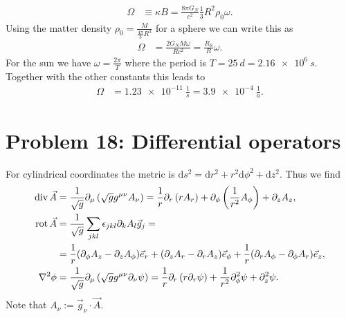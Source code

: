 \documentclass[english, parskip=full]{scrartcl}
\newcommand{\kla}{}
\newcommand{\tecxt}{}
\begin{document}
\begin{align}
\Omega &\equiv \kappa B = \frac{8\pi G_N}{c^2} \frac{1}{3} R^2\rho_0 \omega.
\end{align}
Using the matter density $\rho_0 = \frac{M}{\frac{4\pi}{3}R^3}$ for a sphere we can write this as
\begin{align}
\Omega &= \frac{2G_NM\omega}{Rc^2} = \frac{R_S}{R} \omega.
\end{align}
For the sun we have $\omega = \frac{2\pi}{T}$ where the period is $T = \SI{25}{d} = \SI{2.16e6}{s}$.
Together with the other constants this leads to 
\begin{align}
\Omega &= \SI{1.23e-11}{\frac{1}{s}} = \SI{3.9e-4}{\frac{1}{a}}.
\end{align}

\section{Problem 18: Differential operators}
For cylindrical coordinates the metric is $\tecxt\text{d}s^2 = \tecxt\text{d}r^2 + r^2\tecxt\text{d}\phi^2 + \tecxt\text{d}z^2$.
Thus we find
\begin{align}
\tecxt\text{div\,} \vec{A} &= \frac{1}{\sqrt{g}} \partial_\mu \kla\left( \sqrt{g} g^{\mu\nu} A_\nu \right) = \frac{1}{r} \partial_r \kla\left( r A_r \right) + \partial_\phi \kla\left( \frac{1}{r^2} A_\phi \right) + \partial_z A_z,\\
\tecxt\text{rot\,} \vec{A} &= \frac{1}{\sqrt{g}} \sum_{jkl} \epsilon_{jkl} \partial_k A_l \vec{g}_j = \\
&= \frac{1}{r} (\partial_\phi A_z - \partial_z A_\phi) \vec{e}_r + (\partial_z A_r - \partial_r A_z) \vec{e}_\phi + \frac{1}{r} (\partial_rA_\phi - \partial_\phi A_r) \vec{e}_z,\\
\nabla^2 \phi &= \frac{1}{\sqrt{g}} \partial_\mu \kla\left( \sqrt{g} g^{\mu\nu} \partial_\nu \psi \right)  = \frac{1}{r}\partial_r \kla\left( r \partial_r \psi \right) + \frac{1}{r^2} \partial_\phi^2 \psi + \partial_z^2\psi.
\end{align}
Note that $A_\nu := \vec{g}_\nu \cdot \vec{A}$.

\end{document}
